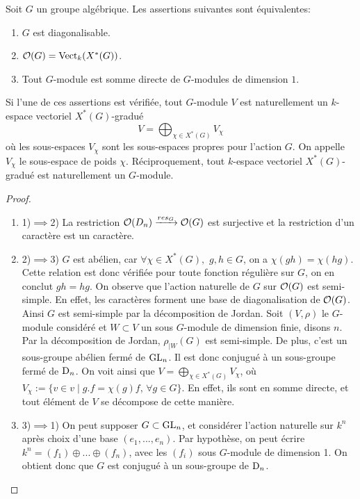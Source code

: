 \begin{prop}\label{GroupeDiagCarac}
Soit $G$ un groupe algébrique. Les assertions suivantes sont équivalentes:
\begin{enumerate}
\item $G$ est diagonalisable.
\item $\mathcal{O}(G)=\operatorname{Vect}_k(X^*(G))$.
\item Tout $G$-module est somme directe de $G$-modules de dimension $1$.
\end{enumerate}
Si l'une de ces assertions est vérifiée, tout $G$-module $V$ est naturellement un $k$-espace vectoriel $X^*(G)$-gradué
$$V=\bigoplus_{\chi \in X^*(G)}V_{\chi}$$
où les sous-espaces $V_{\chi}$ sont les sous-espaces propres pour l'action $G$. On appelle $V_{\chi}$ le sous-espace de poids $\chi$. Réciproquement, tout $k$-espace vectoriel $X^*(G)$-gradué est naturellement un $G$-module.
\end{prop}
\begin{proof}
\begin{enumerate}
\item 1)$\implies$2) La restriction $\mathcal{O}(D_n)\xrightarrow{res_G} \mathcal{O}(G)$ est surjective et la restriction d'un caractère est un caractère.
\item 2)$\implies$3) $G$ est abélien, car $\forall \chi\in X^*(G),\,\,g,h\in G$, on a $\chi(gh)=\chi(hg)$. Cette relation est donc vérifiée pour toute fonction régulière sur $G$, on en conclut $gh=hg$. On observe que l'action naturelle de $G$ sur $\mathcal{O}(G)$ est semi-simple. En effet, les caractères forment une base de diagonalisation de $\mathcal{O}(G)$. Ainsi $G$ est semi-simple par la décomposition de Jordan. Soit $(V,\rho)$ le $G$-module considéré et $W\subset V$ un sous $G$-module de dimension finie, disons $n$. Par la décomposition de Jordan,  $\rho_{|W}(G)$ est semi-simple. De plus, c'est un sous-groupe abélien fermé de $\operatorname{GL}_n$. Il est donc conjugué à un sous-groupe fermé de $\operatorname{D}_n$. On voit ainsi que $V=\bigoplus_{\chi \in X^*(G)}V_\chi$, où $V_\chi:=\lbrace v\in v\mid g.f=\chi(g)f,\, \forall g\in G \rbrace$. En effet, ils sont en somme directe, et tout élément de $V$ se décompose de cette manière.
\item 3)$\implies$1) On peut supposer $G\subset \operatorname{GL}_n$, et considérer l'action naturelle sur $k^n$ après choix d'une base $(e_1,...,e_n)$. Par hypothèse, on peut écrire $k^n=(f_1)\oplus...\oplus (f_n)$, avec les $(f_i)$ sous $G$-module de dimension 1. On obtient donc que $G$ est conjugué à un sous-groupe de $\operatorname{D}_n$.
\end{enumerate}
\end{proof}



